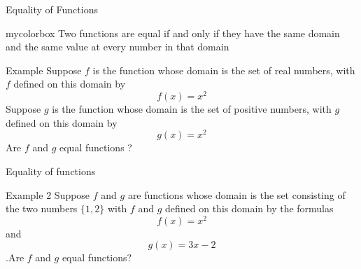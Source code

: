 \documentclass{beamer}
\begin{document}
\begin{frame}{Equality of Functions}
  \begin{beamercolorbox}[wd=\textwidth,rounded=true,shadow=true]{mycolorbox}
    Two functions are equal if and only if they have the same domain and the same value at every number in that domain
  \end{beamercolorbox}
  \begin{exampleblock}{Example}
    Suppose \(f\) is the function whose domain is the set of real numbers, with \(f\) defined
    on this domain by
    \[f (x) = x^2\]
    Suppose \(g\) is the function whose domain is the set of positive numbers, with \(g\)
    defined on this domain by
    \[g(x) = x^2\]
    Are \(f\) and \(g\) equal functions ?
  \end{exampleblock}
\end{frame}
\begin{frame}{Equality of functions}
  \begin{exampleblock}{Example 2}
    Suppose \(f\) and \(g\) are functions whose domain is the set consisting of the two numbers \(\{1, 2\}\) with \(f\) and \(g\) defined on this domain by the formulas
\[f (x) = x^2\] and \[g(x) = 3x-2\].Are \(f\) and \(g\) equal functions?
  \end{exampleblock}
\end{frame}
\end{document}
